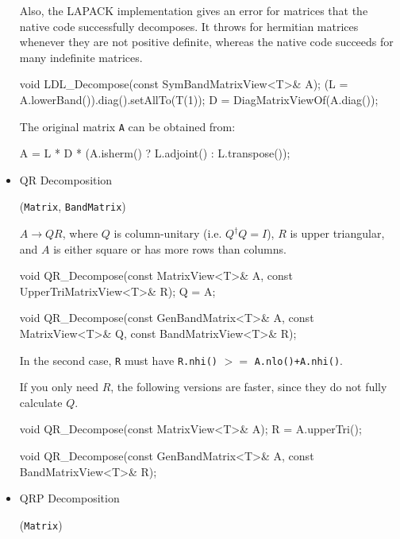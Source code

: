\documentclass[twoside,letterpaper,11pt]{article}
\renewcommand{\tt}[1]{{\lstinline {#1}}}
\begin{document}
\begin{itemize}
{Also, the LAPACK implementation gives an error for matrices that the native code
successfully decomposes.  It throws for hermitian matrices whenever they are 
not positive definite, whereas the native code succeeds for many indefinite matrices.
}

\begin{tmvcode}
void LDL_Decompose(const SymBandMatrixView<T>& A);
(L = A.lowerBand()).diag().setAllTo(T(1));
D = DiagMatrixViewOf(A.diag());
\end{tmvcode}

The original matrix \tt{A} can be obtained from:
\begin{tmvcode}
A = L * D * (A.isherm() ? L.adjoint() : L.transpose());
\end{tmvcode}

\item QR Decomposition 

(\tt{Matrix}, \tt{BandMatrix})

$A \rightarrow Q R$, where $Q$ is column-unitary 
(i.e. $Q^\dagger Q = I$), $R$ is upper triangular, and $A$ is either square or 
has more rows than columns.

\begin{tmvcode}
void QR_Decompose(const MatrixView<T>& A, 
      const UpperTriMatrixView<T>& R);
Q = A;

void QR_Decompose(const GenBandMatrix<T>& A, 
      const MatrixView<T>& Q, const BandMatrixView<T>& R);
\end{tmvcode}
In the second case, \tt{R} must have \tt{R.nhi()} $>=$ \tt{A.nlo()+A.nhi()}.

If you only need $R$, the following versions are faster, since they do 
not fully calculate $Q$.
\begin{tmvcode}
void QR_Decompose(const MatrixView<T>& A);
R = A.upperTri();

void QR_Decompose(const GenBandMatrix<T>& A, 
      const BandMatrixView<T>& R);
\end{tmvcode}

\item QRP Decomposition 

(\tt{Matrix})


\end{itemize}
\end{document}
